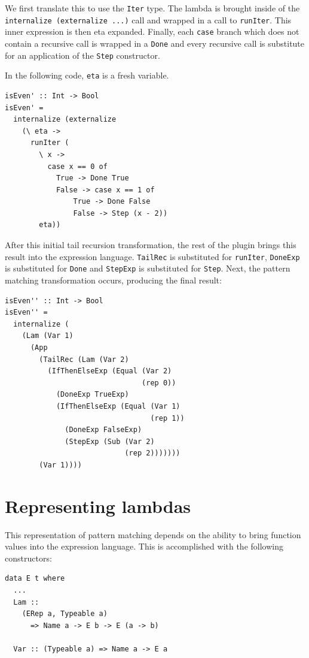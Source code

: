 \documentclass[sigplan,anonymous,review]{acmart}
\newcommand{\ttt}{\texttt}
\begin{document}
We first translate this to use the \verb|Iter| type. The lambda is brought
inside of the \ttt{internalize (externalize ...)} call and wrapped in a call to
\ttt{runIter}. This inner expression is then eta expanded. Finally, each \verb|case|
branch which does not contain a recursive call is wrapped in a \verb|Done| and
every recursive call is substitute for an application of the \verb|Step| constructor.

In the following code, \verb|eta| is a fresh variable.

\begin{lstlisting}
isEven' :: Int -> Bool
isEven' =
  internalize (externalize
    (\ eta ->
      runIter (
        \ x ->
          case x == 0 of
            True -> Done True
            False -> case x == 1 of
                True -> Done False
                False -> Step (x - 2))
        eta))
\end{lstlisting}

After this initial tail recursion transformation, the rest of the plugin brings this
result into the expression language. \verb|TailRec| is substituted for \verb|runIter|,
\verb|DoneExp| is substituted for \verb|Done| and \verb|StepExp| is substituted for \verb|Step|.
Next, the pattern matching transformation occurs, producing the final result:


\begin{lstlisting}
isEven'' :: Int -> Bool
isEven'' =
  internalize (
    (Lam (Var 1)
      (App
        (TailRec (Lam (Var 2)
          (IfThenElseExp (Equal (Var 2)
                                (rep 0))
            (DoneExp TrueExp)
            (IfThenElseExp (Equal (Var 1)
                                  (rep 1))
              (DoneExp FalseExp)
              (StepExp (Sub (Var 2)
                            (rep 2)))))))
        (Var 1))))
\end{lstlisting}

\section{Representing lambdas}
\label{sec:LamRep}

This representation of pattern matching depends on the ability to bring
function values into the expression language. This is accomplished
with the following constructors:

\begin{lstlisting}
data E t where
  ...
  Lam ::
    (ERep a, Typeable a)
      => Name a -> E b -> E (a -> b)

  Var :: (Typeable a) => Name a -> E a
\end{lstlisting}
\end{document}
